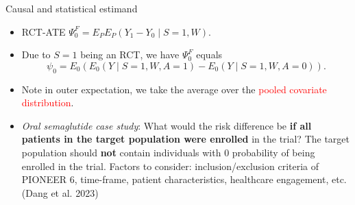 \documentclass[t]{beamer}
\begin{document}
\begin{frame}{Causal  and statistical estimand}
\begin{itemize}
\item RCT-ATE $\Psi^F_0=E_PE_P(Y_1-Y_0\mid S=1,W)$.
\item Due to $S=1$ being an RCT, we have $\Psi^F_0$ equals {\small
\[ \psi_0=E_0\left( E_0(Y\mid S=1,W,A=1)-E_0(Y\mid S=1,W,A=0)\right).\]}
\item Note in  outer expectation, we take the average over the \textcolor{red}{pooled covariate distribution}. 
\item \textit{Oral semaglutide case study}: What would the risk difference be \textbf{if all patients in the target population were enrolled} in the trial? The target population should \textbf{not} contain individuals with 0 probability of being enrolled in the trial. Factors to consider: inclusion/exclusion criteria of PIONEER 6, time-frame, patient characteristics, healthcare engagement, etc. (Dang et al. 2023)
\end{itemize}
\end{frame}
\end{document}
